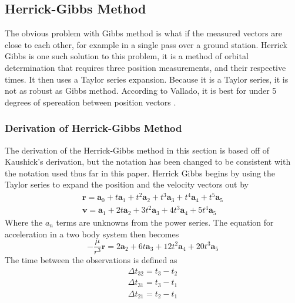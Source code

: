 \documentclass[12pt]{article}
\begin{document}
	\subsection{Herrick-Gibbs Method}
	The obvious problem with Gibbs method is what if the measured vectors are close to each other, for example in a single pass over a ground station. Herrick Gibbs is one such solution to this problem, it is a method of orbital determination that requires three position measurements, and their respective times. It then uses a Taylor series expansion. Because it is a Taylor series, it is not as robust as Gibbs method. According to Vallado, it is best for under 5 degrees of spereation between position vectors \cite{vallado2007fundamentals}.
	
	\subsubsection{Derivation of Herrick-Gibbs Method}
	The derivation of the Herrick-Gibbs method in this section is based off of Kaushick's derivation\cite{Kaushick}, but the notation has been changed to be consistent with the notation used thus far in this paper. Herrick Gibbs begins by using the Taylor series to expand the position and the velocity vectors out by 
	\begin{equation}
	\begin{array} { l } { \mathbf { r } = \mathbf { a } _ { 0 } + t \mathbf { a } _ { 1 } + t ^ { 2 } \mathbf { a } _ { 2 } + t ^ { 3 } \mathbf { a } _ { 3 } + t ^ { 4 } \mathbf { a } _ { 4 } + t ^ { 5 } \mathbf { a } _ { 5 } } \\ { \mathbf { v } = \mathbf { a } _ { 1 } + 2 t \mathbf { a } _ { 2 } + 3 t ^ { 2 } \mathbf { a } _ { 3 } + 4 t ^ { 3 } \mathbf { a } _ { 4 } + 5 t ^ { 4 } \mathbf { a } _ { 5 } } \end{array}
	\end{equation}
	Where the $a_n$ terms are unknowns from the power series. The equation for acceleration in a two body system then becomes
	\begin{equation}
	- \frac { \mu } { r ^ { 3 } } \mathbf { r } = 2 \mathbf { a } _ { 2 } + 6 t \mathbf { a } _ { 3 } + 12 t ^ { 2 } \mathbf { a } _ { 4 } + 20 t ^ { 3 } \mathbf { a } _ { 5 }
	\end{equation}
	The time between the observations is defined as 
	\begin{equation}
	\begin{array} { l } { \Delta t _ { 32 } = t _ { 3 } - t _ { 2 } } \\ { \Delta t _ { 31 } = t _ { 3 } - t _ { 1 } } \\ { \Delta t _ { 21 } = t _ { 2 } - t _ { 1 } } \end{array}
	\end{equation}
\end{document}
